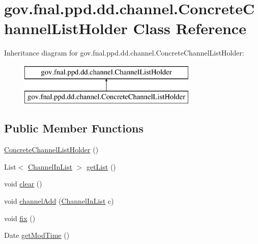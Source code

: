 \hypertarget{classgov_1_1fnal_1_1ppd_1_1dd_1_1channel_1_1ConcreteChannelListHolder}{\section{gov.\-fnal.\-ppd.\-dd.\-channel.\-Concrete\-Channel\-List\-Holder Class Reference}
\label{classgov_1_1fnal_1_1ppd_1_1dd_1_1channel_1_1ConcreteChannelListHolder}
}
Inheritance diagram for gov.\-fnal.\-ppd.\-dd.\-channel.\-Concrete\-Channel\-List\-Holder\-:\begin{figure}[H]
\begin{center}
\leavevmode
\includegraphics[height=2.000000cm]{classgov_1_1fnal_1_1ppd_1_1dd_1_1channel_1_1ConcreteChannelListHolder}
\end{center}
\end{figure}
\subsection*{Public Member Functions}
\begin{DoxyCompactItemize}
\item 
\hyperlink{classgov_1_1fnal_1_1ppd_1_1dd_1_1channel_1_1ConcreteChannelListHolder_ad1ee4768a28585c3b34e82263564978c}{Concrete\-Channel\-List\-Holder} ()
\item 
List$<$ \hyperlink{classgov_1_1fnal_1_1ppd_1_1dd_1_1channel_1_1ChannelInList}{Channel\-In\-List} $>$ \hyperlink{classgov_1_1fnal_1_1ppd_1_1dd_1_1channel_1_1ConcreteChannelListHolder_affa1b398ed9fc7dbad18215765653e14}{get\-List} ()
\item 
void \hyperlink{classgov_1_1fnal_1_1ppd_1_1dd_1_1channel_1_1ConcreteChannelListHolder_aef1741e4b499729c50dce421c87938b8}{clear} ()
\item 
void \hyperlink{classgov_1_1fnal_1_1ppd_1_1dd_1_1channel_1_1ConcreteChannelListHolder_ad56aa51994e24f71e2ae6879de6d0bb7}{channel\-Add} (\hyperlink{classgov_1_1fnal_1_1ppd_1_1dd_1_1channel_1_1ChannelInList}{Channel\-In\-List} c)
\item 
void \hyperlink{classgov_1_1fnal_1_1ppd_1_1dd_1_1channel_1_1ConcreteChannelListHolder_aa560e7478cd1776380d9ff8e131c65c7}{fix} ()
\item 
Date \hyperlink{classgov_1_1fnal_1_1ppd_1_1dd_1_1channel_1_1ConcreteChannelListHolder_a2495c874dcc8254b8b6c9e15e981d4c0}{get\-Mod\-Time} ()
\end{DoxyCompactItemize}


